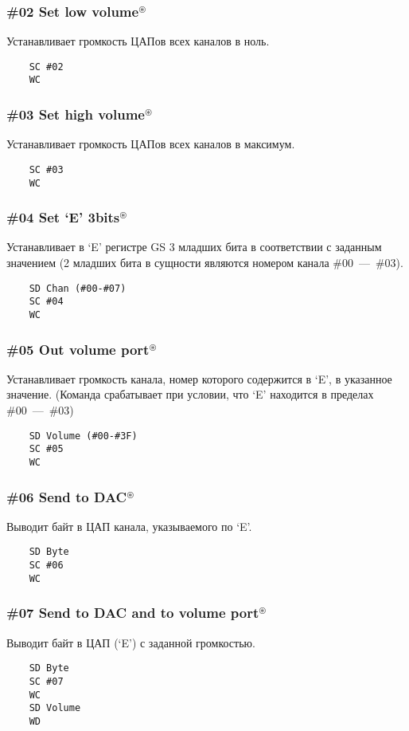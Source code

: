 \documentclass[a4paper,11pt]{article}
\DeclareRobustCommand{\Cyrax}{\texorpdfstring{\(^\circledast\)}{\circledast}}
\begin{document}
\subsubsection{\#02 Set low volume\Cyrax}
Устанавливает громкость ЦАПов всех каналов в ноль.
\begin{verbatim}
    SC #02
    WC
\end{verbatim}

\subsubsection{\#03 Set high volume\Cyrax}
Устанавливает громкость ЦАПов всех каналов в максимум.
\begin{verbatim}
    SC #03
    WC
\end{verbatim}

\subsubsection{\#04 Set ‘E’ 3bits\Cyrax}
Устанавливает в `E' регистре GS 3 младших бита в соответствии с заданным значением (2  младших бита в сущности являются номером канала \#00~---~\#03).
\begin{verbatim}
    SD Chan (#00-#07)
    SC #04
    WC
\end{verbatim}

\subsubsection{\#05 Out volume port\Cyrax}
Устанавливает громкость канала, номер которого содержится в `E', в указанное значение. (Команда срабатывает при условии, что `E' находится в пределах \#00~---~\#03)
\begin{verbatim}
    SD Volume (#00-#3F)
    SC #05
    WC
\end{verbatim}

\subsubsection{\#06 Send to DAC\Cyrax}
Выводит байт в ЦАП канала, указываемого по `E'.
\begin{verbatim}
    SD Byte
    SC #06
    WC
\end{verbatim}

\subsubsection{\#07 Send to DAC and to volume port\Cyrax}
Выводит байт в ЦАП (`E') с заданной громкостью.
\begin{verbatim}
    SD Byte
    SC #07
    WC
    SD Volume
    WD
\end{verbatim}
\end{document}
